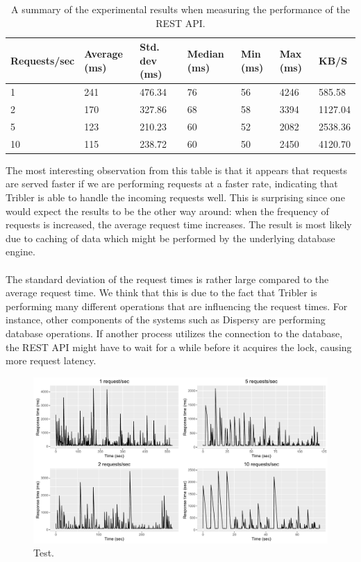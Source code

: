 \begin{table}[]
	\centering
	\begin{tabular}{|l|l|l|l|l|l|l|}
		\hline
		\textbf{Requests/sec} & \textbf{Average (ms)} & \textbf{Std. dev (ms)} & \textbf{Median (ms)} & \textbf{Min (ms)} & \textbf{Max (ms)} & \textbf{KB/S} \\ \hline
		1 & 241 & 476.34 & 76 & 56 & 4246 & 585.58\\ \hline
		2 & 170 & 327.86 & 68 & 58 & 3394 & 1127.04\\ \hline
		5 & 123 & 210.23 & 60 & 52 & 2082 & 2538.36\\ \hline
		10 & 115 & 238.72 & 60 & 50 & 2450 & 4120.70\\ \hline
	\end{tabular}
	\caption{A summary of the experimental results when measuring the performance of the REST API.}
	\label{table:performance-api-results}
\end{table}

The most interesting observation from this table is that it appears that requests are served faster if we are performing requests at a faster rate, indicating that Tribler is able to handle the incoming requests well. This is surprising since one would expect the results to be the other way around: when the frequency of requests is increased, the average request time increases. The result is most likely due to caching of data which might be performed by the underlying database engine.\\\\
The standard deviation of the request times is rather large compared to the average request time. We think that this is due to the fact that Tribler is performing many different operations that are influencing the request times. For instance, other components of the systems such as Dispersy are performing database operations. If another process utilizes the connection to the database, the REST API might have to wait for a while before it acquires the lock, causing more request latency.

\begin{figure}[!h]
	\centering
	\includegraphics[width=1.0\columnwidth]{images/experiments/api_performance}
	\caption{Test.}
	\label{fig:api-performance}
\end{figure}

